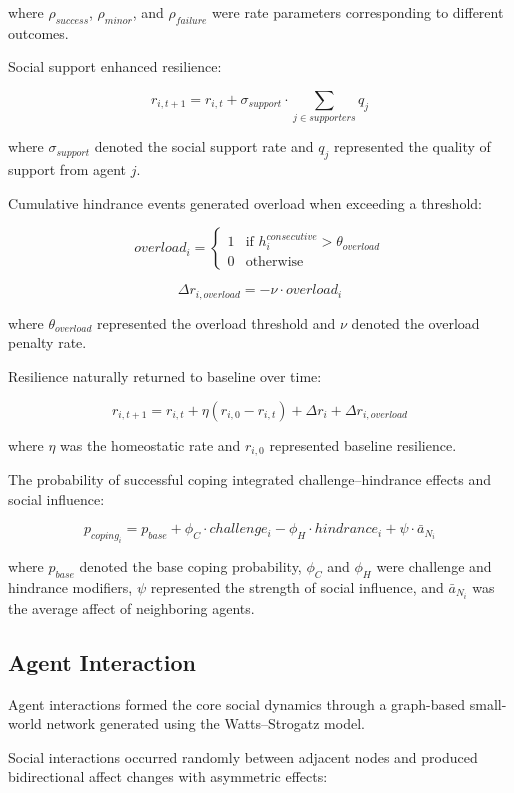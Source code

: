 \documentclass[
  letterpaper,
  DIV=11,
  numbers=noendperiod]{scrartcl}
\begin{document}
where \(\rho_{success}\), \(\rho_{minor}\), and \(\rho_{failure}\) were
rate parameters corresponding to different outcomes.

Social support enhanced resilience:

\[r_{i,t+1} = r_{i,t} + \sigma_{support} \cdot \sum_{j \in supporters} q_j\]

where \(\sigma_{support}\) denoted the social support rate and \(q_j\)
represented the quality of support from agent \(j\).

Cumulative hindrance events generated overload when exceeding a
threshold:

\[overload_i = \begin{cases} 1 & \text{if } h_i^{consecutive} > \theta_{overload} \\ 0 & \text{otherwise} \end{cases}\]

\[\Delta r_{i,overload} = -\nu \cdot overload_i\]

where \(\theta_{overload}\) represented the overload threshold and
\(\nu\) denoted the overload penalty rate.

Resilience naturally returned to baseline over time:

\[r_{i,t+1} = r_{i,t} + \eta (r_{i,0} - r_{i,t}) + \Delta r_i + \Delta r_{i,overload}\]

where \(\eta\) was the homeostatic rate and \(r_{i,0}\) represented
baseline resilience.

The probability of successful coping integrated challenge--hindrance
effects and social influence:

\[p_{coping_i} = p_{base} + \phi_C \cdot challenge_i - \phi_H \cdot hindrance_i + \psi \cdot \bar{a}_{N_i}\]

where \(p_{base}\) denoted the base coping probability, \(\phi_C\) and
\(\phi_H\) were challenge and hindrance modifiers, \(\psi\) represented
the strength of social influence, and \(\bar{a}_{N_i}\) was the average
affect of neighboring agents.

\subsection{Agent Interaction}\label{agent-interaction}

Agent interactions formed the core social dynamics through a graph-based
small-world network generated using the Watts--Strogatz model.

Social interactions occurred randomly between adjacent nodes and
produced bidirectional affect changes with asymmetric effects:
\end{document}
